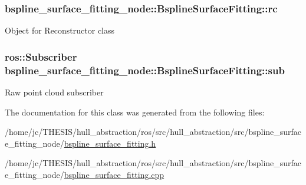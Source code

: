 \subsubsection[{\texorpdfstring{rc}{rc}}]{ bspline\+\_\+surface\+\_\+fitting\+\_\+node\+::\+Bspline\+Surface\+Fitting\+::rc\hspace{0.3cm}{\ttfamily [private]}}\hypertarget{classbspline__surface__fitting__node_1_1_bspline_surface_fitting_a37fc14202f71f41647bc78ed21a1f691}{}\label{classbspline__surface__fitting__node_1_1_bspline_surface_fitting_a37fc14202f71f41647bc78ed21a1f691}
Object for Reconstructor class 
\subsubsection[{\texorpdfstring{sub}{sub}}]{\setlength{\rightskip}{0pt plus 5cm}ros\+::\+Subscriber bspline\+\_\+surface\+\_\+fitting\+\_\+node\+::\+Bspline\+Surface\+Fitting\+::sub\hspace{0.3cm}{\ttfamily [private]}}\hypertarget{classbspline__surface__fitting__node_1_1_bspline_surface_fitting_a1ca9460f2069655ce0b55683a6622688}{}\label{classbspline__surface__fitting__node_1_1_bspline_surface_fitting_a1ca9460f2069655ce0b55683a6622688}
Raw point cloud subscriber 

The documentation for this class was generated from the following files\+:\begin{DoxyCompactItemize}
\item 
/home/jc/\+T\+H\+E\+S\+I\+S/hull\+\_\+abstraction/ros/src/hull\+\_\+abstraction/src/bspline\+\_\+surface\+\_\+fitting\+\_\+node/\hyperlink{bspline__surface__fitting_8h}{bspline\+\_\+surface\+\_\+fitting.\+h}\item 
/home/jc/\+T\+H\+E\+S\+I\+S/hull\+\_\+abstraction/ros/src/hull\+\_\+abstraction/src/bspline\+\_\+surface\+\_\+fitting\+\_\+node/\hyperlink{bspline__surface__fitting_8cpp}{bspline\+\_\+surface\+\_\+fitting.\+cpp}\end{DoxyCompactItemize}
